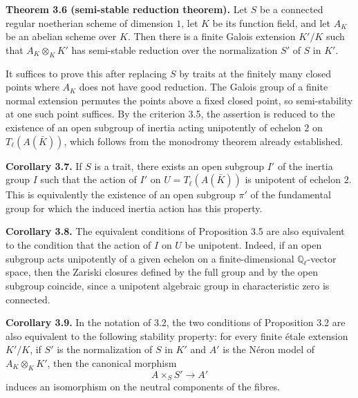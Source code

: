 \documentclass[11pt]{article}
\providecommand{\Q}{\mathbb Q}
\begin{document}
\textbf{Theorem 3.6 (semi-stable reduction theorem).} Let \(S\) be a connected regular noetherian scheme of dimension \(1\), let \(K\) be its function field, and let \(A_K\) be an abelian scheme over \(K\).  Then there is a finite Galois extension \(K'/K\) such that \(A_K\otimes_KK'\) has semi-stable reduction over the normalization \(S'\) of \(S\) in \(K'\).

It suffices to prove this after replacing \(S\) by traits at the finitely many closed points where \(A_K\) does not have good reduction.  The Galois group of a finite normal extension permutes the points above a fixed closed point, so semi-stability at one such point suffices.  By the criterion 3.5, the assertion is reduced to the existence of an open subgroup of inertia acting unipotently of echelon \(2\) on \(T_\ell(A(\bar K))\), which follows from the monodromy theorem already established.

\textbf{Corollary 3.7.} If \(S\) is a trait, there exists an open subgroup \(I'\) of the inertia group \(I\) such that the action of \(I'\) on \(U=T_\ell(A(\bar K))\) is unipotent of echelon \(2\).  This is equivalently the existence of an open subgroup \(\pi'\) of the fundamental group for which the induced inertia action has this property.

\textbf{Corollary 3.8.} The equivalent conditions of Proposition 3.5 are also equivalent to the condition that the action of \(I\) on \(U\) be unipotent.  Indeed, if an open subgroup acts unipotently of a given echelon on a finite-dimensional \(\Q_\ell\)-vector space, then the Zariski closures defined by the full group and by the open subgroup coincide, since a unipotent algebraic group in characteristic zero is connected.

\textbf{Corollary 3.9.} In the notation of 3.2, the two conditions of Proposition 3.2 are also equivalent to the following stability property: for every finite étale extension \(K'/K\), if \(S'\) is the normalization of \(S\) in \(K'\) and \(A'\) is the Néron model of \(A_K\otimes_KK'\), then the canonical morphism
\[
        A\times_SS'\longrightarrow A'
\]
induces an isomorphism on the neutral components of the fibres.
\end{document}
